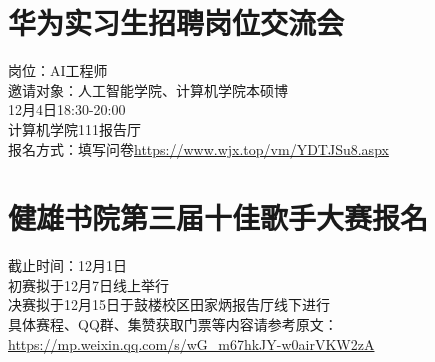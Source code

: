 \documentclass[letterpaper, 12pt]{article}
\begin{document}
\begin{multicols}{2}
\section{华为实习生招聘岗位交流会}
岗位：AI工程师\\
邀请对象：人工智能学院、计算机学院本硕博\\
12月4日18:30-20:00\\
计算机学院111报告厅\\
报名方式：填写问卷\url{https://www.wjx.top/vm/YDTJSu8.aspx}

\section{健雄书院第三届十佳歌手大赛报名}
截止时间：12月1日\\
初赛拟于12月7日线上举行\\
决赛拟于12月15日于鼓楼校区田家炳报告厅线下进行\\
具体赛程、QQ群、集赞获取门票等内容请参考原文：\url{https://mp.weixin.qq.com/s/wG_m67hkJY-w0airVKW2zA}
\end{multicols}
\end{document}
